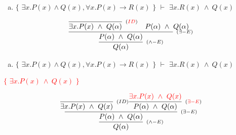 \documentclass[aspectratio=43]{beamer}
\begin{document}
    \begin{frame}[fragile]
    
    	\begin{enumerate}[d)]
			\item $\{$ $\exists x.P(x)\land Q(x), \forall x.P(x)\to R(x)$ $\}$ $\vdash$ $\exists x.R(x)\ \land\ Q(x) $\\
		\end{enumerate}
        
        \vspace{80pt}
        
        \[
        \begin{array}{c}
		
        	\infer[_{(\land -E)}] 
                	{Q(\alpha)}
                    {\infer[_{(\exists -E)}]
                    	{P(\alpha)\ \land \ Q(\alpha)}
                    	{\infer[_{(\textcolor{red}{ID})}]
                        	{\exists x.P(x)\ \land \ Q(\alpha)}
                            {}
                        \hspace{10pt}
                        P(\alpha)\ \land \ Q(\alpha)
                        }
                    }
		\end{array}
        \]
        
	\end{frame}
    
     \begin{frame}[fragile]
    
    	\begin{enumerate}[d)]
			\item $\{$ $\exists x.P(x)\land Q(x), \forall x.P(x)\to R(x)$ $\}$ $\vdash$ $\exists x.R(x)\ \land\ Q(x) $\\
		\end{enumerate}
        \textcolor{red}{$\{$ $\exists x.P(x)\ \land \ Q(x)$ $\}$}
        \vspace{80pt}
        
        \[
        \begin{array}{c}
		
        	\infer[_{(\land -E)}] 
                	{Q(\alpha)}
                    {\infer[_{(\exists -E)}]
                    	{P(\alpha)\ \land \ Q(\alpha)}
                    	{\infer[_{(ID)}]
                        	{\exists x.P(x)\ \land \ Q(x)}
                            {}
                        \infer[_{(\textcolor{red}{\exists -E})}] 
                        	{P(\alpha)\ \land \ Q(\alpha)}
                            {\textcolor{red}{\exists x.P(x)\ \land \ Q(x)}}
                        }
                    }
		\end{array}
        \]
        
	\end{frame}
        
\end{document}

